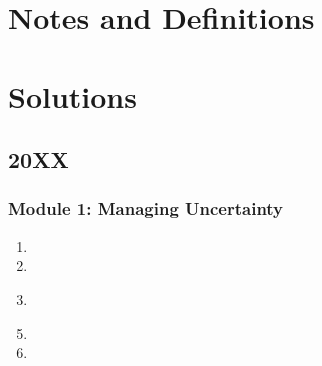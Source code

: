 \documentclass[fleqn,titlepage]{book}
\numberwithin{equation}{section}
\theoremstyle{plain}
\theoremstyle{definition}
\theoremstyle{remark}
\begin{document}
\part{Notes and Definitions}




\part{Solutions}


\chapter{20XX}
\section{Module 1: Managing Uncertainty}
\begin{enumerate}[label=\bfseries  \arabic*.]\setcounter{enumi}{0}
\item 
\item 
\end{enumerate}
\begin{enumerate}[label=\bfseries  \arabic*.]\setcounter{enumi}{2}
\section{Module 2: Probability and Distributions}
\item 
\end{enumerate}
\begin{enumerate}[label=\bfseries  \arabic*.]\setcounter{enumi}{4}
\section{Module 3: Particle Mechanics}
\item %
\item %
\end{enumerate}
\end{document}
